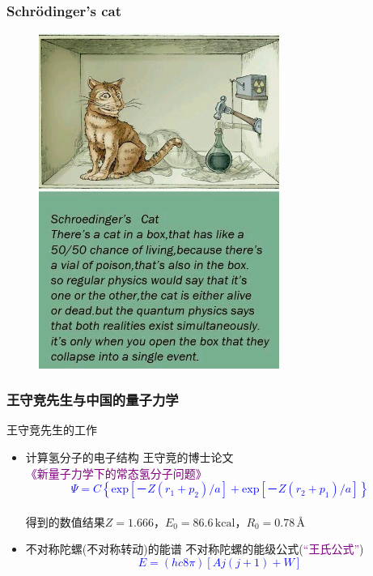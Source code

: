 \documentclass[cjk,slidestop,handout,compress,mathserif,blue]{beamer}	%
\begin{document}
\frame
{
	\frametitle{Schr\"odinger's cat}
\begin{figure}[h!]
\centering
\vspace{-10.5pt}
\includegraphics[height=0.70\textwidth,width=0.7\textwidth,viewport=0 0 760 750,clip]{Figures/Schrodinger-cat.jpg}
\label{Schrodinger-cat}
\end{figure}
}

\frame
{
	\frametitle{王守竞先生与中国的量子力学}
	王守竞先生的工作
	\begin{itemize}
		\item 计算氢分子的电子结构
			\vskip 2.5pt
			王守竞的博士论文\textcolor{purple}{《新量子力学下的常态氢分子问题》}
	\textcolor{blue}{
	\begin{displaymath}
		\Psi=C\left\{ \mathrm{exp}[－Z(r_1+ p_2)/a]+\mathrm{exp}[－Z( r_2+ p_1)/a] \right\}
	\end{displaymath}}
	{\fontsize{7.2pt}{6.5pt}}\\
	得到的数值结果$Z=1.666$，$E_0=86.6\,\mathrm{kcal}$，$R_0=0.78$\,\textrm{\AA}
		\item 不对称陀螺(不对称转动)的能谱
			\vskip 2.5pt
			不对称陀螺的能级公式(\textcolor{purple}{“王氏公式”})
	\textcolor{blue}{
	\begin{displaymath}
		E= (hc8\pi)[Aj(j+1)+W]
	\end{displaymath}}
	\end{itemize}
}
\end{document}
